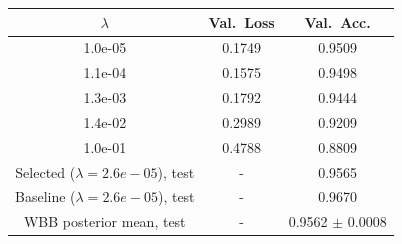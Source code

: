 \begin{tabular}{ccc}
\hline
$\lambda$ & Val.~Loss & Val.~Acc. \\
\hline
1.0e-05 & 0.1749 & 0.9509 \\
1.1e-04 & 0.1575 & 0.9498 \\
1.3e-03 & 0.1792 & 0.9444 \\
1.4e-02 & 0.2989 & 0.9209 \\
1.0e-01 & 0.4788 & 0.8809 \\
\hline
Selected ($\lambda=2.6e-05$), test & - & 0.9565 \\
Baseline ($\lambda=2.6e-05$), test & - & 0.9670 \\
WBB posterior mean, test & - & 0.9562 $\pm$ 0.0008 \\
\hline
\end{tabular}
